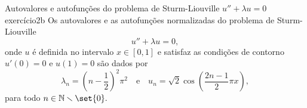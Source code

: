 \begin{proposition}{Autovalores e autofunções do problema de Sturm-Liouville \(u'' + \lambda u = 0\)}{exercício2b}
    Os autovalores e as autofunções normalizadas do problema de Sturm-Liouville
    \begin{equation*}
        u'' + \lambda u = 0,
    \end{equation*}
    onde \(u\) é definida no intervalo \(x \in [0,1]\) e satisfaz as condições de contorno \(u'(0) = 0\) e \(u(1) = 0\) são dados por
    \begin{equation*}
        \lambda_n = \left(n-\frac{1}{2}\right)^2\pi^2\quad\text{e}\quad
        u_n =\sqrt{2} \cos\left(\frac{2n-1}{2}\pi x\right),
    \end{equation*}
    para todo \(n \in \mathbb{N}\smallsetminus\set{0}.\)
\end{proposition}

